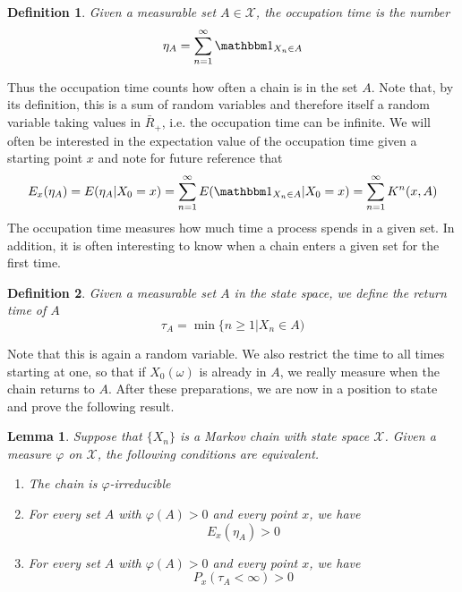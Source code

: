 \documentclass[a4paper, draft]{article}
\theoremstyle{own}
\newtheorem{lem}[thm]{Lemma}
\newtheorem{defn}{Definition}[section]
\theoremstyle{remark}
\begin{document}
\begin{defn}
	Given a measurable set $A \in {\mathcal X}$, the {\em occupation time} is the number
	$$
	\eta_A = \sum_{n=1}^\infty {\mathbbm 1}_{X_n \in A}
	$$
\end{defn}

Thus the occupation time counts how often a chain is in the set $A$. Note that, by its definition, this is a sum of random variables and therefore itself a random variable taking values in $\bar{R}_+$, i.e. the occupation time can be infinite. We will often be interested in the expectation value of the occupation time given a starting point $x$ and note for future reference that
$$
E_x(\eta_A) = E(\eta_A | X_0 = x) = \sum_{n=1}^\infty E({\mathbbm 1}_{X_n \in A} | X_0 = x) = \sum_{n=1}^\infty K^n(x,A)
$$
The occupation time measures how much time a process spends in a given set. In addition, it is often interesting to know when a chain enters a given set for the first time. 

\begin{defn}
	Given a measurable set $A$ in the state space, we define the {\em return time} of $A$ 
	$$
	\tau_A = \min\{ n \geq 1 | X_n \in A)
	$$
\end{defn}
Note that this is again a random variable. We also restrict the time to all times starting at one, so that if $X_0(\omega)$ is already in $A$, we really measure when the chain returns to $A$. After these preparations, we are now in a position to state and prove the following result.

\begin{lem}
	Suppose that $\{X_n\}$ is a Markov chain with state space ${\mathcal X}$. Given a measure $\varphi$ on ${\mathcal X}$, the following conditions are equivalent.
	\begin{enumerate}
		\item The chain is $\varphi$-irreducible
		\item For every set $A$ with $\varphi(A) > 0$ and every point $x$, we have 
		$$
		E_x(\eta_A) > 0
		$$
		\item For every set $A$ with $\varphi(A) > 0$ and every point $x$, we have 
		$$
		P_x(\tau_A < \infty) > 0
		$$
	\end{enumerate}
\end{lem}
\end{document}
